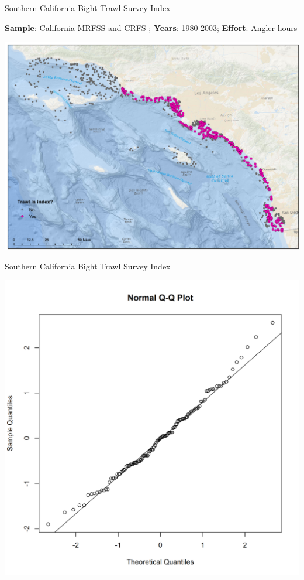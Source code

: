 \documentclass[ignorenonframetext,compress]{beamer}
\begin{document}
\begin{frame}{Southern California Bight Trawl Survey Index}

\textbf{Sample}: California MRFSS and CRFS ; \textbf{Years}: 1980-2003;
\textbf{Effort}: Angler hours

\includegraphics{Figures/Fleet11_SCBSurvey_map.pdf}

\end{frame}

\begin{frame}{Southern California Bight Trawl Survey Index}

\includegraphics{Figures/Fleet11_SCBsurvey_QQ.png}

\end{frame}
\end{document}
